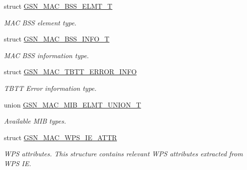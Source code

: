 \begin{DoxyCompactItemize}
struct \hyperlink{a00110}{GSN\_\-MAC\_\-BSS\_\-ELMT\_\-T}
\begin{DoxyCompactList}\small\item\em MAC BSS element type. \end{DoxyCompactList}\item 
struct \hyperlink{a00111}{GSN\_\-MAC\_\-BSS\_\-INFO\_\-T}
\begin{DoxyCompactList}\small\item\em MAC BSS information type. \end{DoxyCompactList}\item 
struct \hyperlink{a00134}{GSN\_\-MAC\_\-TBTT\_\-ERROR\_\-INFO}
\begin{DoxyCompactList}\small\item\em TBTT Error information type. \end{DoxyCompactList}\item 
union \hyperlink{a00117}{GSN\_\-MAC\_\-MIB\_\-ELMT\_\-UNION\_\-T}
\begin{DoxyCompactList}\small\item\em Available MIB types. \end{DoxyCompactList}\item 
struct \hyperlink{a00138}{GSN\_\-MAC\_\-WPS\_\-IE\_\-ATTR}
\begin{DoxyCompactList}\small\item\em WPS attributes. This structure contains relevant WPS attributes extracted from WPS IE. \end{DoxyCompactList}\end{DoxyCompactItemize}
